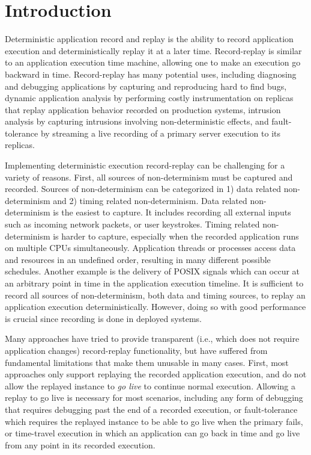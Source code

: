 \chapter{Introduction}
\label{ch:intro}

Deterministic application record and replay is the ability to record application
execution and deterministically replay it at a later time. 
Record-replay is similar to an application execution time machine, allowing
one to make an execution go backward in time. Record-replay has
many potential uses, including diagnosing and debugging applications by
capturing and reproducing hard to find bugs, dynamic application analysis by
performing costly instrumentation on replicas that replay application behavior
recorded on production systems, intrusion analysis by capturing intrusions
involving non-deterministic effects, and fault-tolerance by streaming
a live recording of a primary server execution to its replicas.

Implementing deterministic execution record-replay can be challenging for a
variety of reasons. First, all sources of non-determinism must be captured and recorded.
Sources of non-determinism can be categorized in 1) data related non-determinism
and 2) timing related non-determinism. Data related non-determinism is the easiest
to capture. It includes recording all external inputs such as incoming network
packets, or user keystrokes. Timing related non-determinism is harder to capture,
especially when the recorded application runs on multiple CPUs simultaneously.
Application threads or processes access data and resources in an undefined
order, resulting in many different possible schedules. Another example is the
delivery of POSIX signals which can occur at an arbitrary point in time in the
application execution timeline. It is sufficient to record all sources of
non-determinism, both data and timing sources, to replay an application
execution deterministically. However, doing so with good performance is crucial
since recording is done in deployed systems.

Many approaches have tried to provide transparent (i.e., which does not require
application changes) record-replay functionality, but have suffered from
fundamental limitations that make them unusable in many cases.  First, most
approaches only support replaying the recorded application execution, and do not
allow the replayed instance to {\em go live} to continue normal execution.
Allowing a replay to go live is necessary for most scenarios, including
any form of debugging that requires debugging past the end of a recorded execution,
or fault-tolerance which requires the replayed instance to be able to go live
when the primary fails, or time-travel execution in which an application can go
back in time and go live from any point in its recorded execution.

